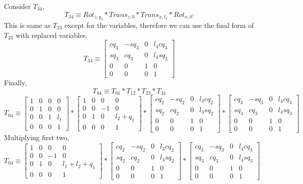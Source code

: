 \documentclass[12pt]{article}
\newcommand{\trans}[3]{\begin{bmatrix} 1 & 0 & 0 & #1 \\ 0 & 1 & 0 & #2 \\ 0 & 0 & 1 & #3 \\ 0 & 0 & 0 & 1 \end{bmatrix}}
\begin{document}
Consider $T_{34}$,
\[
  T_{34} \equiv Rot_{z, q_3} * Trans_{z, 0} * Trans_{x, l_4} * Rot_{x, 0^{\circ}}
\]
This is same as $T_{23}$ except for the variables, therefore we can use the final form of $T_{23}$ with replaced variables.
\[
  T_{34} \equiv
  \begin{bmatrix} cq_3 & -sq_3 & 0 & l_4cq_3 \\ sq_3 & cq_3 & 0 & l_4sq_3 \\ 0 & 0 & 1 & 0 \\ 0 & 0 & 0 & 1 \end{bmatrix}
\]
Finally,
\[
  T_{04} \equiv T_{01} * T_{12} * T_{23} * T_{34}
\]
\[
  T_{04} \equiv
  \trans{0}{0}{l_1}
  *
  \begin{bmatrix} 1 & 0 & 0 & 0 \\ 0 & 0 & -1 & 0 \\ 0 & 1 & 0 & l_2 + q_1 \\ 0 & 0 & 0 & 1 \end{bmatrix}
  *
  \begin{bmatrix} cq_2 & -sq_2 & 0 & l_3cq_2 \\ sq_2 & cq_2 & 0 & l_3sq_2 \\ 0 & 0 & 1 & 0 \\ 0 & 0 & 0 & 1 \end{bmatrix}
  *
  \begin{bmatrix} cq_3 & -sq_3 & 0 & l_4cq_3 \\ sq_3 & cq_3 & 0 & l_4sq_3 \\ 0 & 0 & 1 & 0 \\ 0 & 0 & 0 & 1 \end{bmatrix}
\]
Multiplying first two,
\[
  T_{04} \equiv
  \begin{bmatrix} 1 & 0 & 0 & 0 \\ 0 & 0 & -1 & 0 \\ 0 & 1 & 0 & l_1 + l_2 + q_1 \\ 0 & 0 & 0 & 1 \end{bmatrix}
  *
  \begin{bmatrix} cq_2 & -sq_2 & 0 & l_3cq_2 \\ sq_2 & cq_2 & 0 & l_3sq_2 \\ 0 & 0 & 1 & 0 \\ 0 & 0 & 0 & 1 \end{bmatrix}
  *
  \begin{bmatrix} cq_3 & -sq_3 & 0 & l_4cq_3 \\ sq_3 & cq_3 & 0 & l_4sq_3 \\ 0 & 0 & 1 & 0 \\ 0 & 0 & 0 & 1 \end{bmatrix}
\]
\end{document}
